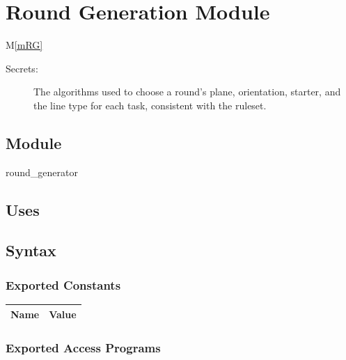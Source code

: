 \documentclass[12pt, titlepage]{article}
\newcommand{\mref}[1]{M\ref{#1}}
\begin{document}
\newpage

\section{Round Generation Module} \mref{mRG} 


\begin{description}
\item[Secrets:] The algorithms used to choose a round's plane, orientation, starter, and the line type for each task, consistent with the ruleset.
\end{description}

\subsection{Module}

round\_generator

\subsection{Uses}


\subsection{Syntax}

\subsubsection{Exported Constants}

\begin{center}
\begin{tabular}{p{10cm} p{4cm}}
\hline
\textbf{Name} & \textbf{Value}\\
\hline


\hline
\end{tabular}
\end{center}

\subsubsection{Exported Access Programs}
\end{document}
